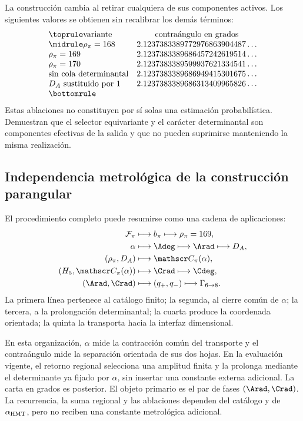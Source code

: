La construcción cambia al retirar cualquiera de sus componentes activos.
Los siguientes valores se obtienen sin recalibrar los demás términos:
\[
\begin{array}{@{}lc@{}}
\toprule
\text{variante}&\text{contraángulo en grados}\\
\midrule
\rho_\pi=168&2.1237383389772976863904487\ldots\\
\rho_\pi=169&2.1237383389686457242619514\ldots\\
\rho_\pi=170&2.1237383389599937621334541\ldots\\
\text{sin cola determinantal}&2.1237383389686949415301675\ldots\\
D_A\text{ sustituido por }1&2.1237383389686313409965826\ldots\\
\bottomrule
\end{array}
\]
Estas ablaciones no constituyen por sí solas una estimación probabilística.
Demuestran que el selector equivariante y el carácter determinantal son
componentes efectivas de la salida y que no pueden suprimirse manteniendo la
misma realización.

\subsection{Independencia metrológica de la construcción parangular}
\label{sec:s102:c38:7:6}


El procedimiento completo puede resumirse como una cadena de aplicaciones:
\[
\begin{aligned}
\mathcal F_\pi
&\longmapsto b_\pi
\longmapsto\rho_\pi=169,\\
\alpha
&\longmapsto \Adeg
\longmapsto \Arad
\longmapsto D_A,\\
(\rho_\pi,D_A)
&\longmapsto\mathscr C_\pi(\alpha),\\
(H_5,\mathscr C_\pi(\alpha))
&\longmapsto \Crad
\longmapsto \Cdeg,\\
(\Arad,\Crad)
&\longmapsto(q_+,q_-)
\longmapsto\Gamma_{6\to8}.
\end{aligned}
\]
La primera línea pertenece al catálogo finito; la segunda, al cierre común de
\(\alpha\); la tercera, a la prolongación determinantal; la cuarta produce la
coordenada orientada; la quinta la transporta hacia la interfaz dimensional.

En esta organización, \(\alpha\) mide la contracción común del transporte y
el contraángulo mide la separación orientada de sus dos hojas. En la
evaluación vigente, el retorno regional selecciona una amplitud finita y la
prolonga mediante el determinante ya fijado por \(\alpha\), sin insertar una
constante externa adicional. La carta en grados es posterior. El objeto
primario es el par de fases \((\Arad,\Crad)\). La recurrencia, la suma
regional y las ablaciones dependen del catálogo y de
\(\alpha_{\rm HMT}\), pero no reciben una constante metrológica adicional.

